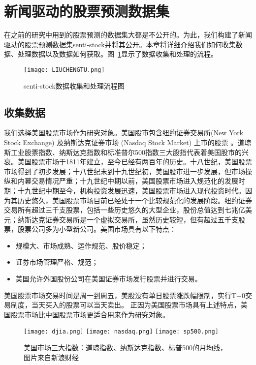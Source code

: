 \section{新闻驱动的股票预测数据集}

在之前的研究中用到的股票预测的数据集大都是不公开的。为此，我们构建了新闻驱动的股票预测数据集senti-stock并将其公开。本章将详细介绍我们如何收集数据、处理数据以及数据如何获取。图~\ref{fig:liuchengtu}显示了数据收集和处理的流程。

\begin{figure}[ht]
	\centering 
	\texttt{[image: LIUCHENGTU.png]}
	\caption{senti-stock数据收集和处理流程图}
	\label{fig:liuchengtu}
\end{figure}

\subsection{收集数据}
我们选择美国股票市场作为研究对象。美国股市包含纽约证券交易所(New York Stock Exchange) 及纳斯达克证券市场 (Nasdaq Stock Market) 上市的股票 。道琼斯工业股票指数、纳斯达克指数和标准普尔500指数三大股指代表着美国股市的兴衰。美国股票市场于1811年建立，至今已经有两百年的历史。十八世纪，美国股票市场得到了初步发展；十八世纪末到十九世纪初，美国股市进一步发展，但市场操纵和内幕交易情况严重；十九世纪中期以前，美国股票市场进入规范化的发展时期；十九世纪中期至今，机构投资发展迅速，美国股票市场进入现代投资时代。因为其历史悠久，美国股票市场目前已经处于一个比较规范化的发展阶段。纽约证券交易所有超过三千支股票，包括一些历史悠久的大型企业，股份总值达到七兆亿美元；纳斯达克证券交易所是一个虚拟交易所，虽然历史较短，但有超过五千支股票，股票公司多为小型新公司。美国市场具有以下特点：
\begin{itemize}
	\item 规模大、市场成熟、运作规范、股价稳定；
	\item 证券市场管理严格、规范；
	\item 美国允许外国股份公司在美国证券市场发行股票并进行交易。
\end{itemize}

美国股票市场交易时间是周一到周五，美股没有单日股票涨跌幅限制，实行T+0交易制度，当天买入的股票可以当天卖出。
正因为美国股票市场具有上述特点，美国股票市场比中国股票市场更适合用来作为研究对象。

\begin{figure}[H]
	\centering 
	\texttt{[image: djia.png]}
	\texttt{[image: nasdaq.png]}
	\texttt{[image: sp500.png]}
	\caption[美国市场三大指数]{美国市场三大指数：道琼指数、纳斯达克指数、标普500的月均线，图片来自新浪财经}
	\label{fig:index}
\end{figure}

